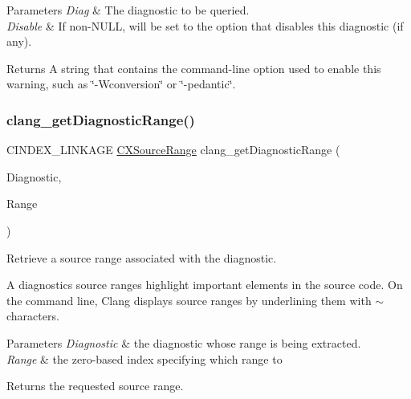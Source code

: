 \begin{DoxyParams}{Parameters}
{\em Diag} & The diagnostic to be queried.\\
\hline
{\em Disable} & If non-\/\+N\+U\+LL, will be set to the option that disables this diagnostic (if any).\\
\hline
\end{DoxyParams}
\begin{DoxyReturn}{Returns}
A string that contains the command-\/line option used to enable this warning, such as \char`\"{}-\/\+Wconversion\char`\"{} or \char`\"{}-\/pedantic\char`\"{}. 
\end{DoxyReturn}
\mbox{\label{group__CINDEX__DIAG_gabd440f1577374289ffebe73d9f65b294}} 
\subsubsection{\texorpdfstring{clang\+\_\+get\+Diagnostic\+Range()}{clang\_getDiagnosticRange()}}
{\footnotesize\ttfamily C\+I\+N\+D\+E\+X\+\_\+\+L\+I\+N\+K\+A\+GE \hyperlink{structCXSourceRange}{C\+X\+Source\+Range} clang\+\_\+get\+Diagnostic\+Range (\begin{DoxyParamCaption}\item[{\hyperlink{group__CINDEX__DIAG_ga44bb8aba7c40590ad25d1763c4fbff7f}{C\+X\+Diagnostic}}]{Diagnostic,  }\item[{unsigned}]{Range }\end{DoxyParamCaption})}



Retrieve a source range associated with the diagnostic. 

A diagnostic\textquotesingle{}s source ranges highlight important elements in the source code. On the command line, Clang displays source ranges by underlining them with \textquotesingle{}$\sim$\textquotesingle{} characters.


\begin{DoxyParams}{Parameters}
{\em Diagnostic} & the diagnostic whose range is being extracted.\\
\hline
{\em Range} & the zero-\/based index specifying which range to\\
\hline
\end{DoxyParams}
\begin{DoxyReturn}{Returns}
the requested source range. 
\end{DoxyReturn}
\mbox{\label{group__CINDEX__DIAG_gaf786e9688b9a685958e486cb81910924}} 
